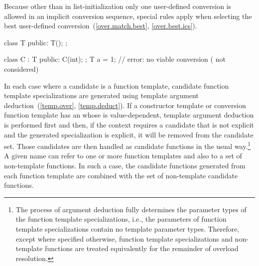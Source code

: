 \pnum
Because other than in list-initialization only one user-defined conversion
is allowed
in an
implicit conversion sequence, special rules apply when selecting
the best user-defined conversion~(\ref{over.match.best},
\ref{over.best.ics}).
\begin{example}
\begin{codeblock}
class T {
public:
  T();
};

class C : T {
public:
  C(int);
};
T a = 1;            // error: no viable conversion ( not considered)
\end{codeblock}
\end{example}

\pnum
In each case where a candidate is a function template, candidate
function template specializations
are generated using template argument deduction~(\ref{temp.over},
\ref{temp.deduct}).
If a constructor template or conversion function template
has an 
whose  is value-dependent,
template argument deduction is performed first and then,
if the context requires a candidate that
is not explicit and the generated specialization is explicit,
it will be removed from the candidate set.
Those candidates are then handled as candidate
functions in the usual way.\footnote{The process of argument deduction fully
determines the parameter types of
the
function template specializations,
i.e., the parameters of
function template specializations
contain
no template parameter types.
Therefore, except where specified otherwise,
function template specializations
and non-template functions are treated equivalently
for the remainder of overload resolution.}
A given name can refer to one or more function templates and also
to a set of non-template functions.
In such a case, the
candidate functions generated from each function template are combined
with the set of non-template candidate functions.

